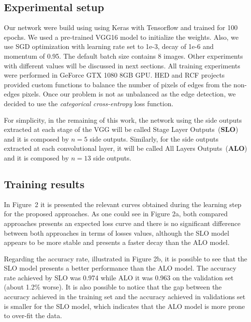 \subsection{Experimental setup}
   
Our network were build using using Keras \cite{chollet2015keras} with Tensorflow \cite{tensorflow2015-whitepaper} and trained for 100 epochs. We used a pre-trained VGG16 model to initialize the weights. Also, we use SGD optimization with learning rate set to 1e-3, decay of 1e-6 and momentum of 0.95. The default batch size contains 8 images. Other experiments with different values will be discussed in next sections. All training experiments were performed in GeForce GTX 1080 8GB GPU. HED and RCF projects provided custom functions to balance the number of pixels of edges from the non-edges pixels. Once our problem is not as unbalanced as the edge detection, we decided to use the  \textit{{categorical} {cross-entropy}} loss function.


For simplicity, in the remaining of this work, the network using the side outputs extracted at each stage of the VGG will be called Stage Layer Outputs~(\textbf{SLO}) and it is composed by $n=5$ side outputs. Similarly, for the side outputs extracted at each convolutional layer, it will be called All Layers Outputs~(\textbf{ALO}) and it is composed by $n=13$ side outputs. 

\subsection{Training results}

In Figure~2 it is presented the relevant curves obtained during the learning step for the proposed approaches. As one could see in Figure 2a, both compared approaches presents an expected loss curve and there is no significant difference between both approaches in terms of losses values, although the SLO model appears to be more stable and presents a faster decay than the ALO model.

Regarding the accuracy rate, illustrated in Figure 2b, it is possible to see that the SLO model presents a better performance than the ALO model. The accuracy rate achieved by SLO was 0.974 while ALO it was 0.963 on the validation set (about 1.2\% worse). It is also possible to notice that the gap between the accuracy achieved in the training set and the accuracy achieved in validations set is smaller for the SLO model, which indicates that the ALO model is more prone to over-fit the data. 

